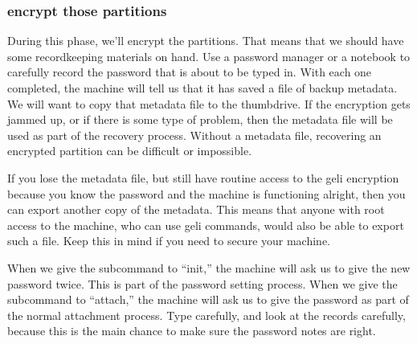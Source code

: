 \subsubsection{  \Gls{encrypt} those partitions}
During this phase, we’ll   \gls{encrypt} the partitions.  That means that we should have some recordkeeping materials on hand.  Use a \gls{password} manager or a notebook to carefully record the \gls{password} that is about to be typed in.  With each one completed, the machine will tell us that it has saved a file of \gls{backup}  \gls{metadata}.  We will want to copy that  \gls{metadata} file to the  \gls{thumbdrive}.  If the   \gls{encrypt}ion gets jammed up, or if there is some type of problem, then the  \gls{metadata} file will be used as part of the recovery process.  Without a  \gls{metadata} file, recovering an   \gls{encrypt}ed \gls{partition} can be difficult or impossible.

If you lose the  \gls{metadata} file, but still have routine access to the geli   \gls{encrypt}ion because you know the \gls{password} and the machine is functioning alright, then you can export another copy of the  \gls{metadata}.  This means that anyone with root access to the machine, who can use geli commands, would also be able to export such a file.  Keep this in mind if you need to secure your machine.

When we give the subcommand to “init,” the machine will ask us to give the new \gls{password} twice.  This is part of the \gls{password} setting process.  When we give the subcommand to “attach,” the machine will ask us to give the \gls{password} as part of the normal attachment process. Type carefully, and look at the records carefully, because this is the main chance to make sure the \gls{password} notes are right.

